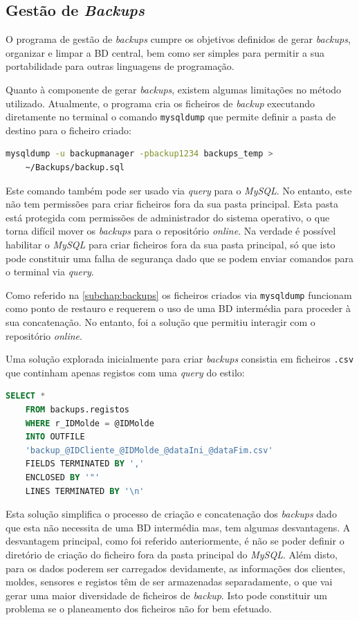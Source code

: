 \documentclass[11pt,twoside,a4paper]{report}
\begin{document}
\subsection{Gestão de \textit{Backups}}
O programa de gestão de \textit{backups} cumpre os objetivos definidos de gerar \textit{backups}, organizar e limpar a BD central, bem como ser simples para permitir a sua portabilidade para outras linguagens de programação.\par 
Quanto à componente de gerar \textit{backups}, existem algumas limitações no método utilizado. Atualmente, o programa cria os ficheiros de \textit{backup} executando diretamente no terminal o comando \texttt{mysqldump} que permite definir a pasta de destino para o ficheiro criado:
\begin{lstlisting}[language = bash]
	mysqldump -u backupmanager -pbackup1234 backups_temp >
	~/Backups/backup.sql
\end{lstlisting}
Este comando também pode ser usado via \textit{query} para o \textit{MySQL}. No entanto, este não tem permissões para criar ficheiros fora da sua pasta principal. Esta pasta está protegida com permissões de administrador do sistema operativo, o que torna difícil mover os \textit{backups} para o repositório \textit{online}. Na verdade é possível habilitar o \textit{MySQL} para criar ficheiros fora da sua pasta principal, só que isto pode constituir uma falha de segurança dado que se podem enviar comandos para o terminal via \textit{query}.\par 
Como referido na \autoref{subchap:backups} os ficheiros criados via \texttt{mysqldump} funcionam como ponto de restauro e requerem o uso de uma BD intermédia para proceder à sua concatenação. No entanto, foi a solução que permitiu interagir com o repositório \textit{online}.\par 
Uma solução explorada inicialmente para criar \textit{backups} consistia em ficheiros \texttt{.csv} que continham apenas registos com uma \textit{query} do estilo:
\begin{lstlisting}[language = SQL]
	SELECT *
	FROM backups.registos
	WHERE r_IDMolde = @IDMolde
	INTO OUTFILE
	'backup_@IDCliente_@IDMolde_@dataIni_@dataFim.csv'
	FIELDS TERMINATED BY ','
	ENCLOSED BY '"'
	LINES TERMINATED BY '\n'
\end{lstlisting}
Esta solução simplifica o processo de criação e concatenação dos \textit{backups} dado que esta não necessita de uma BD intermédia mas, tem algumas desvantagens. A desvantagem principal, como foi referido anteriormente, é não se poder definir o diretório de criação do ficheiro fora da pasta principal do \textit{MySQL}. Além disto, para os dados poderem ser carregados devidamente, as informações dos clientes, moldes, sensores e registos têm de ser armazenadas separadamente, o que vai gerar uma maior diversidade de ficheiros de \textit{backup}. Isto pode constituir um problema se o planeamento dos ficheiros não for bem efetuado.\par 
\end{document}
